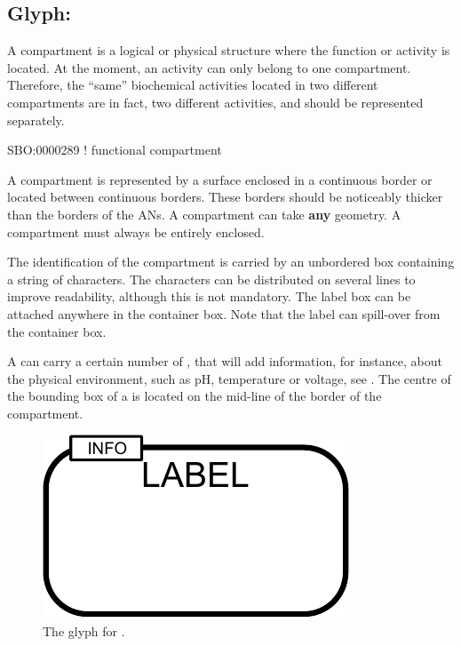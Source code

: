 \subsection{Glyph: }\label{sec:compartment}

A compartment is a logical or physical structure where the function or activity is located.  At the moment, an activity can only belong to one compartment. Therefore, the ``same'' biochemical activities located in two different compartments are in fact, two different activities, and should be represented separately.

\begin{glyphDescription}

\glyphSboTerm  SBO:0000289 ! functional compartment

\glyphContainer A compartment is represented by a surface enclosed in a continuous border or located between continuous borders. These borders should be noticeably thicker than the borders of the ANs. A compartment can take \textbf{any} geometry. A compartment must always be entirely enclosed.

\glyphLabel The identification of the compartment is carried by an unbordered box containing a string of characters. The characters can be distributed on several lines to improve readability, although this is not mandatory. The label box can be attached anywhere in the container box. Note that the label can spill-over from the container box.

\glyphAux A  can carry a certain number of , that will add information, for instance, about the physical environment, such as pH, temperature or voltage, see .  The centre of the bounding box of a  is located on the mid-line of the border of the compartment.

\end{glyphDescription}

\begin{figure}[H]
  \centering
  \includegraphics[scale = 1]{images/build/compartment.pdf}
  \caption{The \AF glyph for .}
  \label{fig:af:compartment}
\end{figure}

